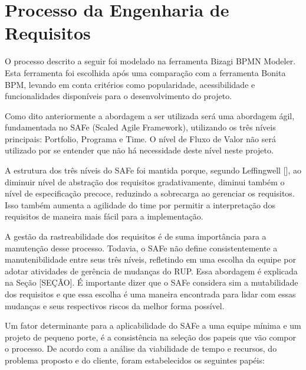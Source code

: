 \chapter[Processo da Engenharia de Requisitos]{Processo da Engenharia de Requisitos}
O processo descrito a seguir foi modelado na ferramenta Bizagi BPMN Modeler. Esta ferramenta foi escolhida após uma comparação com a ferramenta Bonita BPM, levando em conta critérios como popularidade, acessibilidade e funcionalidades disponíveis para o desenvolvimento do projeto.

Como dito anteriormente a abordagem a ser utilizada será uma abordagem ágil, fundamentada no SAFe (Scaled Agile Framework), utilizando os três níveis principais: Portfolio, Programa e Time. O nível de Fluxo de Valor não será utilizado por se entender que não há necessidade deste nível neste projeto.

A estrutura dos três níveis do SAFe foi mantida porque, segundo Leffingwell [\citeyear{leffingwell}], ao diminuir nível de abstração dos requisitos gradativamente, diminui também o nível de especificação precoce, reduzindo a sobrecarga ao gerenciar os requisitos. Isso também aumenta a agilidade do time por permitir a interpretação dos requisitos de maneira mais fácil para a implementação.

A gestão da rastreabilidade dos requisitos é de suma importância para a manutenção desse processo. Todavia, o SAFe não define consistentemente a manutenibilidade entre seus três níveis, refletindo em uma escolha da equipe por adotar atividades de gerência de mudanças do RUP. Essa abordagem é explicada na Seção [SEÇÃO]. É importante dizer que o SAFe considera sim a mutabilidade dos requisitos e que essa escolha é uma maneira encontrada para lidar com essas mudanças e seus respectivos riscos da melhor forma possível.

Um fator determinante para a aplicabilidade do SAFe a uma equipe mínima e um projeto de pequeno porte, é a consistência na seleção dos papeis que vão compor o processo. De acordo com a análise da viabilidade de tempo e recursos, do problema proposto e do cliente, foram estabelecidos os seguintes papéis:

